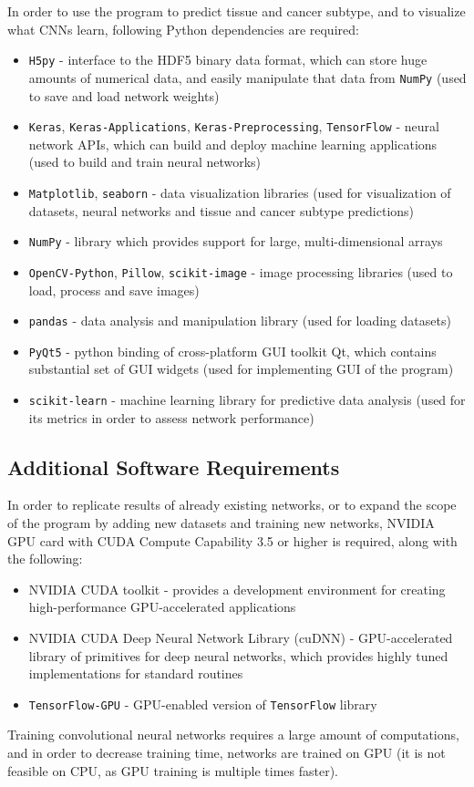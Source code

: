 In order to use the program to predict tissue and cancer subtype, and to visualize what CNNs learn, following Python dependencies are required: 
\begin{itemize}
	\itemsep 0em
	\item \texttt{H5py} - interface to the HDF5 binary data format, which can store huge amounts of numerical data, and easily manipulate that data from \texttt{NumPy} (used to save and load network weights)
	\item \texttt{Keras}, \texttt{Keras-Applications}, \texttt{Keras-Preprocessing}, \texttt{TensorFlow} - neural network APIs, which can build and deploy machine learning applications (used to build and train neural networks)
	\item \texttt{Matplotlib}, \texttt{seaborn} - data visualization libraries (used for visualization of datasets, neural networks and tissue and cancer subtype predictions)
	\item \texttt{NumPy} - library which provides support for large, multi-dimensional arrays
	\item \texttt{OpenCV-Python}, \texttt{Pillow}, \texttt{scikit-image} - image processing libraries (used to load, process and save images)
	\item \texttt{pandas} - data analysis and manipulation library (used for loading datasets)
	\item \texttt{PyQt5} - python binding of cross-platform GUI toolkit Qt, which contains substantial set of GUI widgets (used for implementing GUI of the program)
	\item \texttt{scikit-learn} - machine learning library for predictive data analysis (used for its metrics in order to assess network performance)
\end{itemize}

\subsection{Additional Software Requirements}

In order to replicate results of already existing networks, or to expand the scope of the program by adding new datasets and training new networks, NVIDIA GPU card with CUDA Compute Capability 3.5 or higher is required, along with the following:
\begin{itemize}
	\itemsep 0em
	\item NVIDIA CUDA toolkit - provides a development environment for creating high-performance GPU-accelerated applications
	\item NVIDIA CUDA Deep Neural Network Library (cuDNN) - GPU-accelerated library of primitives for deep neural networks, which provides highly tuned implementations for standard routines
	\item \texttt{TensorFlow-GPU} - GPU-enabled version of \texttt{TensorFlow} library
\end{itemize}
Training convolutional neural networks requires a large amount of computations, and in order to decrease training time, networks are trained on GPU (it is not feasible on CPU, as GPU training is multiple times faster).


